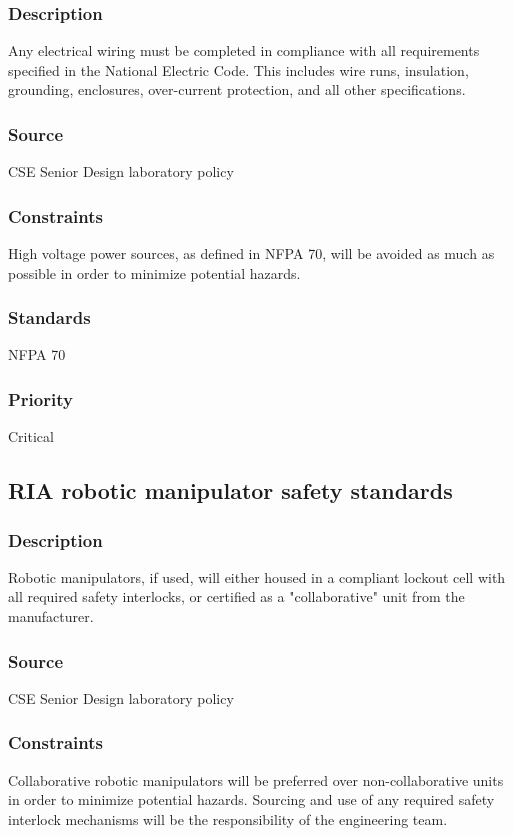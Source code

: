 \subsubsection{Description}
Any electrical wiring must be completed in compliance with all requirements specified in the National Electric Code. This includes wire runs, insulation, grounding, enclosures, over-current protection, and all other specifications.
\subsubsection{Source}
CSE Senior Design laboratory policy
\subsubsection{Constraints}
High voltage power sources, as defined in NFPA 70, will be avoided as much as possible in order to minimize potential hazards.
\subsubsection{Standards}
NFPA 70
\subsubsection{Priority}
Critical

\subsection{RIA robotic manipulator safety standards}
\subsubsection{Description}
Robotic manipulators, if used, will either housed in a compliant lockout cell with all required safety interlocks, or certified as a "collaborative" unit from the manufacturer.
\subsubsection{Source}
CSE Senior Design laboratory policy
\subsubsection{Constraints}
Collaborative robotic manipulators will be preferred over non-collaborative units in order to minimize potential hazards. Sourcing and use of any required safety interlock mechanisms will be the responsibility of the engineering team.

